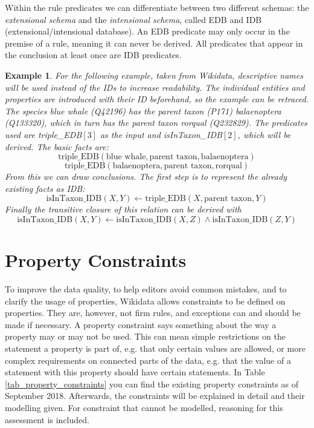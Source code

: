 \documentclass[hyperref,bachelorofscience,fleqn]{cgvpub}
\newtheorem{example}{Example}
\begin{document}
Within the rule predicates we can differentiate between two different schemas: the \emph{extensional schema} and the \emph{intensional schema}, called EDB and IDB (extensional/intensional database). An EDB predicate may only occur in the premise of a rule, meaning it can never be derived. All predicates that appear in the conclusion at least once are IDB predicates.

\begin{example}
For the following example, taken from Wikidata, descriptive names will be used instead of the IDs to increase readability. The individual entities and properties are introduced with their ID beforehand, so the example can be retraced. The species \emph{blue whale} (Q42196) has the \emph{parent taxon} (P171) \emph{balaenoptera} (Q133320), which in turn has the parent taxon \emph{rorqual} (Q232829). The predicates used are triple\_EDB\([3]\) as the input and isInTaxon\_IDB\([2]\), which will be derived. The basic facts are:
\[\text{triple\_EDB}(\text{blue whale}, \text{parent taxon}, \text{balaenoptera})\]
\[\text{triple\_EDB}(\text{balaenoptera}, \text{parent taxon}, \text{rorqual})\]
From this we can draw conclusions. The first step is to represent the already existing facts as IDB:
\[\text{isInTaxon\_IDB}(X, Y) \leftarrow \text{triple\_EDB}(X, \text{parent taxon}, Y)\]
Finally the transitive closure of this relation can be derived with
\[\text{isInTaxon\_IDB}(X, Y) \leftarrow \text{isInTaxon\_IDB}(X, Z) \wedge \text{isInTaxon\_IDB}(Z, Y)\]
\end{example}

\chapter{Property Constraints}\label{cha_property_constraints}

To improve the data quality, to help editors avoid common mistakes, and to clarify the usage of properties, Wikidata allows constraints to be defined on properties. They are, however, not firm rules, and exceptions can and should be made if necessary. A property constraint says something about the way a property may or may not be used. This can mean simple restrictions on the statement a property is part of, e.g. that only certain values are allowed, or more complex requirements on connected parts of the data, e.g. that the value of a statement with this property should have certain statements. In Table \ref{tab_property_constraints} you can find the existing property constraints as of September 2018. Afterwards, the constraints will be explained in detail and their modelling given. For constraint that cannot be modelled, reasoning for this assessment is included.
\end{document}
